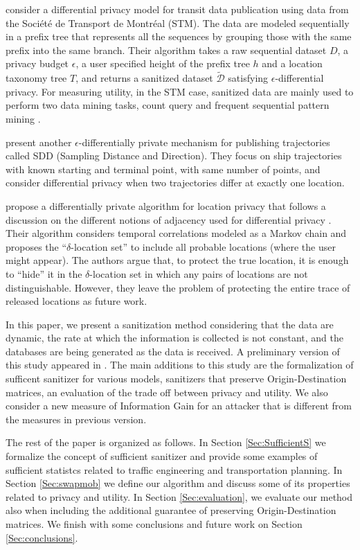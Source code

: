 \cite{Chen:2012} consider a differential privacy model for transit data publication using data from the Soci\'{e}t\'{e} de Transport de Montr\'{e}al (STM). 
The data are modeled sequentially in a prefix tree that represents all the sequences by grouping those with the same prefix into the same branch.
Their algorithm takes a raw sequential dataset $D$, a privacy budget $\epsilon$, a user specified height of the prefix tree $h$ and a location taxonomy tree $T$, and returns a sanitized dataset $\tilde{\mathcal{D}}$ satisfying $\epsilon$-differential privacy.
For measuring utility, in the STM case, sanitized data are mainly used to perform two
data mining tasks, count query and frequent sequential pattern mining \citep{Agrawal:1995}.


\cite{Jiang:2013} present another $\epsilon$-differentially private mechanism for publishing trajectories called SDD (Sampling Distance and Direction). 
They focus on ship trajectories with known starting and terminal point, with same number of points, and consider differential privacy when two trajectories differ at exactly one location.


\cite{Xiao:2015} propose a differentially private algorithm for location privacy that follows a discussion on the different notions of adjacency used for  differential privacy \citep[for e.g.]{Chatzik:2013,Kifer:2011}.
Their algorithm considers temporal correlations modeled as a Markov chain and proposes the ``$\delta$-location set'' to include all probable locations (where the user might appear). The authors argue that, to protect the true location, it is enough to “hide” it in the $\delta$-location set in which any pairs of locations are not distinguishable.
However, they leave the problem of protecting the entire trace of released locations as future work.


In this paper, we present a sanitization method considering that the data are dynamic, the rate at which the information is collected is not constant, and the databases are being generated as the data is received. 
A preliminary version of this study appeared in \cite{Salas:2018-c}.  
The main additions to this study are the formalization of sufficent sanitizer for various models, sanitizers that preserve Origin-Destination matrices, an evaluation of the trade off between privacy and utility. We also consider a new measure of Information Gain for an attacker that is different from the measures in previous version.

  
The rest of the paper is organized as follows. In Section \ref{Sec:SufficientS} we formalize the concept of sufficient sanitizer and provide some examples of sufficient statistcs related to traffic engineering and transportation planning. 
In Section \ref{Sec:swapmob} we define our algorithm and discuss some of its properties related to privacy and utility.  
In Section \ref{Sec:evaluation}, we evaluate our method also when including the additional guarantee of preserving Origin-Destination matrices. 
We finish with some conclusions and future work on Section \ref{Sec:conclusions}.

